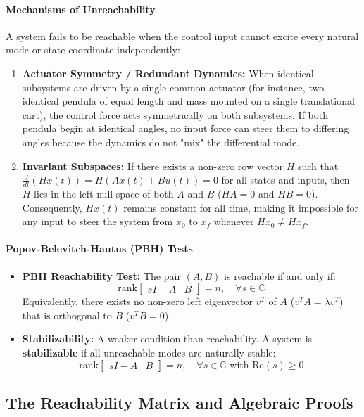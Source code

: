 \documentclass[12pt,onecolumn,twoside ]{article}
\begin{document}
	\paragraph{Mechanisms of Unreachability}
	A system fails to be reachable when the control input cannot excite every natural mode or state coordinate independently:
	\begin{enumerate}
		\item
		\textbf{Actuator Symmetry / Redundant Dynamics:} When identical subsystems are driven by a single common actuator (for instance, two identical pendula of equal length and mass mounted on a single translational cart), the control force acts symmetrically on both subsystems. If both pendula begin at identical angles, no input force can steer them to differing angles because the dynamics do not "mix" the differential mode.
		\item
		\textbf{Invariant Subspaces:} If there exists a non-zero row vector $H$ such that $\frac{d}{dt}(Hx(t)) = H(Ax(t) + Bu(t)) = 0$ for all states and inputs, then $H$ lies in the left null space of both $A$ and $B$ ($HA = 0$ and $HB = 0$). Consequently, $Hx(t)$ remains constant for all time, making it impossible for any input to steer the system from $x_0$ to $x_f$ whenever $Hx_0 \neq Hx_f$.
	\end{enumerate}
	\paragraph{Popov-Belevitch-Hautus (PBH) Tests}
	\begin{itemize}
		\item
		\textbf{PBH Reachability Test:} The pair $(A, B)$ is reachable if and only if: \[
		\text{rank}\begin{bmatrix} sI - A & B \end{bmatrix} = n, \quad \forall s \in \mathbb{C}
		\] Equivalently, there exists no non-zero left eigenvector $v^T$ of $A$ ($v^T A = \lambda v^T$) that is orthogonal to $B$ ($v^T B = 0$).
		\item
		\textbf{Stabilizability:} A weaker condition than reachability. A system is \textbf{stabilizable} if all unreachable modes are naturally stable: \[
		\text{rank}\begin{bmatrix} sI - A & B \end{bmatrix} = n, \quad \forall s \in \mathbb{C} \text{ with } \text{Re}(s) \ge 0
		\]
	\end{itemize}
	
	\subsection{The Reachability Matrix and Algebraic Proofs}
\end{document}
